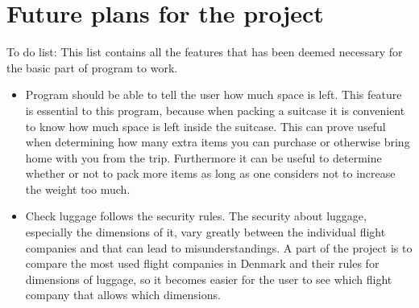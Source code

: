 \section{Future plans for the project}


To do list:
This list contains all the features that has been deemed necessary for the basic part of program to work.

\begin{itemize}
\item Program should be able to tell the user how much space is left.
This feature is essential to this program, because when packing a suitcase it is convenient to know how much space is left inside the suitcase. This can prove useful when determining how many extra items you can purchase or otherwise bring home with you from the trip. Furthermore it can be useful to determine whether or not to pack more items as long as one considers not to increase the weight too much.

\item Check luggage follows the security rules.
The security about luggage, especially the dimensions of it, vary greatly between the individual flight companies and that can lead to misunderstandings. A part of the project is to compare the most used flight companies in Denmark and their rules for dimensions of luggage, so it becomes easier for the user to see which flight company that allows which dimensions. 
\end{itemize}

